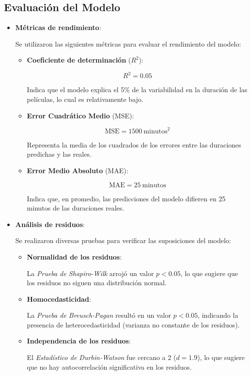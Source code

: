 \documentclass{article}
\begin{document}
\subsection{Evaluación del Modelo}
\begin{itemize}
    \item \textbf{Métricas de rendimiento}:

    Se utilizaron las siguientes métricas para evaluar el rendimiento del modelo:

    \begin{itemize}
        \item \textbf{Coeficiente de determinación} (\( R^2 \)):
        

\[
        R^2 = 0.05
        \]


        Indica que el modelo explica el 5\% de la variabilidad en la duración de las películas, lo cual es relativamente bajo.

        \item \textbf{Error Cuadrático Medio} (MSE):
        

\[
        \text{MSE} = 1500 \ \text{minutos}^2
        \]


        Representa la media de los cuadrados de los errores entre las duraciones predichas y las reales.

        \item \textbf{Error Medio Absoluto} (MAE):
        

\[
        \text{MAE} = 25 \ \text{minutos}
        \]


        Indica que, en promedio, las predicciones del modelo difieren en 25 minutos de las duraciones reales.
    \end{itemize}

    \item \textbf{Análisis de residuos}:

    Se realizaron diversas pruebas para verificar las suposiciones del modelo:

    \begin{itemize}
        \item \textbf{Normalidad de los residuos}:

        La \textit{Prueba de Shapiro-Wilk} arrojó un valor \( p < 0.05 \), lo que sugiere que los residuos no siguen una distribución normal.

        \item \textbf{Homocedasticidad}:

        La \textit{Prueba de Breusch-Pagan} resultó en un valor \( p < 0.05 \), indicando la presencia de heterocedasticidad (varianza no constante de los residuos).

        \item \textbf{Independencia de los residuos}:

        El \textit{Estadístico de Durbin-Watson} fue cercano a 2 (\( d = 1.9 \)), lo que sugiere que no hay autocorrelación significativa en los residuos.
    \end{itemize}
\end{itemize}
\end{document}

